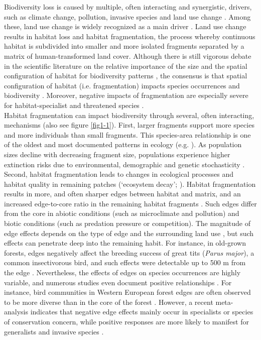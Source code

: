 \documentclass[10pt, twoside]{book} %
\begin{document}
Biodiversity loss is caused by multiple, often interacting and synergistic, drivers, such as climate change, pollution, invasive species and land use change \citep{Bongaarts2019}. Among these, land use change is widely recognized as a main driver \citep{Pimm2014, Haddad2015}. Land use change results in habitat loss and habitat fragmentation, the process whereby continuous habitat is subdivided into smaller and more isolated fragments separated by a matrix of human-transformed land cover. Although there is still vigorous debate in the scientific literature on the relative importance of the size and the spatial configuration of habitat for biodiversity patterns \citep{Fahrig2013, Hanski2015, Fahrig2017, Haddad2017, Fletcher2018, Fahrig2019, Saura2021}, the consensus is that spatial configuration of habitat (i.e. fragmentation) impacts species occurrences and biodiversity \citep{Fischer2007, Haddad2015, Chase2020}. Moreover, negative impacts of fragmentation are especially severe for habitat-specialist and threatened species \citep{Pfeifer2017}.\\

Habitat fragmentation can impact biodiversity through several, often interacting, mechanisms (also see figure \ref{fig1-1}). First, larger fragments support more species and more individuals than small fragments. This species-area relationship is one of the oldest and most documented patterns in ecology (e.g. \citealt{Arrhenius1921, Preston1962, MacArthur1967}). As population sizes decline with decreasing fragment size, populations experience higher extinction risks due to environmental, demographic and genetic stochasticity \citep{Lande1993, Andren1994}.\\

Second, habitat fragmentation leads to changes in ecological processes and habitat quality in remaining patches (`ecosystem decay'; \citealt{Chase2020}). Habitat fragmentation results in more, and often sharper edges between habitat and matrix, and an increased edge-to-core ratio in the remaining habitat fragments \citep{Fischer2007}. Such edges differ from the core in abiotic conditions (such as microclimate and pollution) and biotic conditions (such as predation pressure or competition). The magnitude of edge effects depends on the type of edge and the surrounding land use \citep{Ries2004}, but such effects can penetrate deep into the remaining habit. For instance, in old-grown forests, edges negatively affect the breeding success of great tits (\textit{Parus major}), a common insectivorous bird, and such effects were detectable up to 500 m from the edge \citep{Wilkin2007}. Nevertheless, the effects of edges on species occurrences are highly variable, and numerous studies even document positive relationships \citep{Fahrig2017}. For instance, bird communities in Western European forest edges are often observed to be more diverse than in the core of the forest \citep{Terraube2016, Melin2018}. However, a recent meta-analysis indicates that negative edge effects mainly occur in specialists or species of conservation concern, while positive responses are more likely to manifest for generalists and invasive species \citep{Pfeifer2017}.\\
\end{document}
